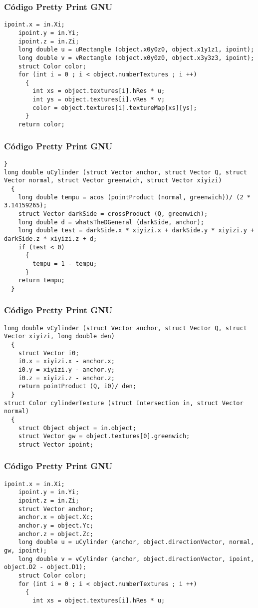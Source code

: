 \documentclass{beamer}
\begin{document}
\begin{frame}[fragile]
\frametitle{C\'odigo Pretty Print GNU}
\begin{lstlisting}[style=CStyle]
    ipoint.x = in.Xi;
    ipoint.y = in.Yi;
    ipoint.z = in.Zi;
    long double u = uRectangle (object.x0y0z0, object.x1y1z1, ipoint);
    long double v = vRectangle (object.x0y0z0, object.x3y3z3, ipoint);
    struct Color color;
    for (int i = 0 ; i < object.numberTextures ; i ++)
      {
        int xs = object.textures[i].hRes * u;
        int ys = object.textures[i].vRes * v;
        color = object.textures[i].textureMap[xs][ys];
      }
    return color;
\end{lstlisting}
\end{frame}
\begin{frame}[fragile]
\frametitle{C\'odigo Pretty Print GNU}
\begin{lstlisting}[style=CStyle]
  }
long double uCylinder (struct Vector anchor, struct Vector Q, struct Vector normal, struct Vector greenwich, struct Vector xiyizi)
  {
    long double tempu = acos (pointProduct (normal, greenwich))/ (2 * 3.14159265);
    struct Vector darkSide = crossProduct (Q, greenwich);
    long double d = whatsTheDGeneral (darkSide, anchor);
    long double test = darkSide.x * xiyizi.x + darkSide.y * xiyizi.y + darkSide.z * xiyizi.z + d;
    if (test < 0)
      {
        tempu = 1 - tempu;
      }
    return tempu;
  }
\end{lstlisting}
\end{frame}
\begin{frame}[fragile]
\frametitle{C\'odigo Pretty Print GNU}
\begin{lstlisting}[style=CStyle]
long double vCylinder (struct Vector anchor, struct Vector Q, struct Vector xiyizi, long double den)
  {
    struct Vector i0;
    i0.x = xiyizi.x - anchor.x;
    i0.y = xiyizi.y - anchor.y;
    i0.z = xiyizi.z - anchor.z;
    return pointProduct (Q, i0)/ den;
  }
struct Color cylinderTexture (struct Intersection in, struct Vector normal)
  {
    struct Object object = in.object;
    struct Vector gw = object.textures[0].greenwich;
    struct Vector ipoint;
\end{lstlisting}
\end{frame}
\begin{frame}[fragile]
\frametitle{C\'odigo Pretty Print GNU}
\begin{lstlisting}[style=CStyle]
    ipoint.x = in.Xi;
    ipoint.y = in.Yi;
    ipoint.z = in.Zi;
    struct Vector anchor;
    anchor.x = object.Xc;
    anchor.y = object.Yc;
    anchor.z = object.Zc;
    long double u = uCylinder (anchor, object.directionVector, normal, gw, ipoint);
    long double v = vCylinder (anchor, object.directionVector, ipoint, object.D2 - object.D1);
    struct Color color;
    for (int i = 0 ; i < object.numberTextures ; i ++)
      {
        int xs = object.textures[i].hRes * u;
\end{lstlisting}
\end{frame}
\end{document}
